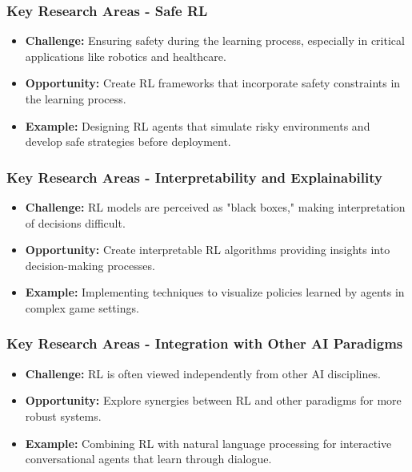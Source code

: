 \documentclass[aspectratio=169]{beamer}
\begin{document}
\begin{frame}[fragile]
    \frametitle{Key Research Areas - Safe RL}
    \begin{itemize}
        \item \textbf{Challenge:} Ensuring safety during the learning process, especially in critical applications like robotics and healthcare.
        \item \textbf{Opportunity:} Create RL frameworks that incorporate safety constraints in the learning process.
        \item \textbf{Example:} Designing RL agents that simulate risky environments and develop safe strategies before deployment.
    \end{itemize}
\end{frame}

\begin{frame}[fragile]
    \frametitle{Key Research Areas - Interpretability and Explainability}
    \begin{itemize}
        \item \textbf{Challenge:} RL models are perceived as "black boxes," making interpretation of decisions difficult.
        \item \textbf{Opportunity:} Create interpretable RL algorithms providing insights into decision-making processes.
        \item \textbf{Example:} Implementing techniques to visualize policies learned by agents in complex game settings.
    \end{itemize}
\end{frame}

\begin{frame}[fragile]
    \frametitle{Key Research Areas - Integration with Other AI Paradigms}
    \begin{itemize}
        \item \textbf{Challenge:} RL is often viewed independently from other AI disciplines.
        \item \textbf{Opportunity:} Explore synergies between RL and other paradigms for more robust systems.
        \item \textbf{Example:} Combining RL with natural language processing for interactive conversational agents that learn through dialogue.
    \end{itemize}
\end{frame}
\end{document}
